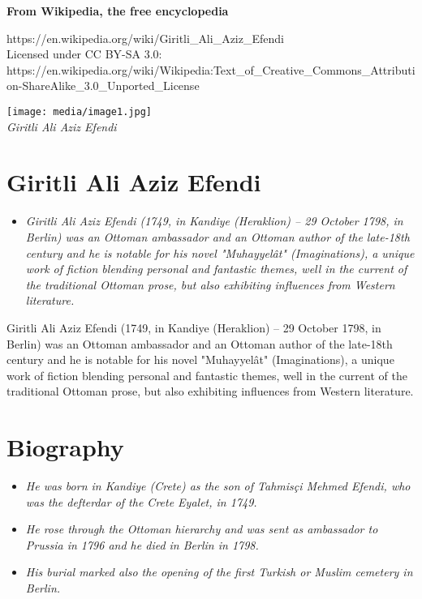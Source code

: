 \textbf{From Wikipedia, the free encyclopedia}

https://en.wikipedia.org/wiki/Giritli\_Ali\_Aziz\_Efendi\\
Licensed under CC BY-SA 3.0:\\
https://en.wikipedia.org/wiki/Wikipedia:Text\_of\_Creative\_Commons\_Attribution-ShareAlike\_3.0\_Unported\_License

\texttt{[image: media/image1.jpg]}\\
\emph{Giritli Ali Aziz Efendi}

\section{Giritli Ali Aziz Efendi}\label{giritli-ali-aziz-efendi}

\begin{itemize}
\item
  \emph{Giritli Ali Aziz Efendi (1749, in Kandiye (Heraklion) -- 29
  October 1798, in Berlin) was an Ottoman ambassador and an Ottoman
  author of the late-18th century and he is notable for his novel
  "Muhayyelât" (Imaginations), a unique work of fiction blending
  personal and fantastic themes, well in the current of the traditional
  Ottoman prose, but also exhibiting influences from Western
  literature.}
\end{itemize}

Giritli Ali Aziz Efendi (1749, in Kandiye (Heraklion) -- 29 October
1798, in Berlin) was an Ottoman ambassador and an Ottoman author of the
late-18th century and he is notable for his novel "Muhayyelât"
(Imaginations), a unique work of fiction blending personal and fantastic
themes, well in the current of the traditional Ottoman prose, but also
exhibiting influences from Western literature.

\section{Biography}\label{biography}

\begin{itemize}
\item
  \emph{He was born in Kandiye (Crete) as the son of Tahmisçi Mehmed
  Efendi, who was the defterdar of the Crete Eyalet, in 1749.}
\item
  \emph{He rose through the Ottoman hierarchy and was sent as ambassador
  to Prussia in 1796 and he died in Berlin in 1798.}
\item
  \emph{His burial marked also the opening of the first Turkish or
  Muslim cemetery in Berlin.}
\end{itemize}

